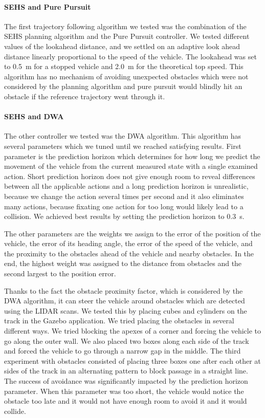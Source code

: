 \paragraph{\gls{SEHS} and Pure Pursuit}
The first trajectory following algorithm we tested was the combination of the \gls*{SEHS} planning algorithm and the Pure Pursuit controller. We tested different values of the lookahead distance, and we settled on an adaptive look ahead distance linearly proportional to the speed of the vehicle. The lookahead was set to \SI{0.5}{\meter} for a stopped vehicle and \SI{2.0}{\meter} for the theoretical top speed. This algorithm has no mechanism of avoiding unexpected obstacles which were not considered by the planning algorithm and pure pursuit would blindly hit an obstacle if the reference trajectory went through it.

\paragraph{\gls{SEHS} and \gls{DWA}}
The other controller we tested was the \gls{DWA} algorithm. This algorithm has several parameters which we tuned until we reached satisfying results. First parameter is the prediction horizon which determines for how long we predict the movement of the vehicle from the current measured state with a single examined action. Short prediction horizon does not give enough room to reveal differences between all the applicable actions and a long prediction horizon is unrealistic, because we change the action several times per second and it also eliminates many actions, because fixating one action for too long would likely lead to a collision. We achieved best results by setting the prediction horizon to \SI{0.3}{\second}.

The other parameters are the weights we assign to the error of the position of the vehicle, the error of its heading angle, the error of the speed of the vehicle, and the proximity to the obstacles ahead of the vehicle and nearby obstacles. In the end, the highest weight was assigned to the distance from obstacles and the second largest to the position error.

Thanks to the fact the obstacle proximity factor, which is considered by the \gls*{DWA} algorithm, it can steer the vehicle around obstacles which are detected using the \gls*{LIDAR} scans. We tested this by placing cubes and cylinders on the track in the Gazebo application. We tried placing the obstacles in several different ways. We tried blocking the apexes of a corner and forcing the vehicle to go along the outer wall. We also placed two boxes along each side of the track and forced the vehicle to go through a narrow gap in the middle. The third experiment with obstacles consisted of placing three boxes one after each other at sides of the track in an alternating pattern to block passage in a straight line. The success of avoidance was significantly impacted by the prediction horizon parameter. When this parameter was too short, the vehicle would notice the obstacle too late and it would not have enough room to avoid it and it would collide.

